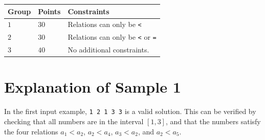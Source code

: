 \noindent
\begin{tabular}{| l | l | l |}
  \hline
  \textbf{Group} & \textbf{Points} & \textbf{Constraints} \\ \hline
  $1$   & $30$       & Relations can only be \texttt{<} \\ \hline
  $2$   & $30$       & Relations can only be \texttt{<} or \texttt{=} \\ \hline
  $3$   & $40$       & No additional constraints. \\ \hline
\end{tabular}

\section*{Explanation of Sample 1}
In the first input example, \texttt{1 2 1 3 3} is a valid solution. This can be verified
by checking that all numbers are in the interval $[1, 3]$, and that the numbers satisfy the four relations $a_1 < a_2$,
$a_2 < a_4$, $a_3 < a_2$, and $a_2 < a_5$.
